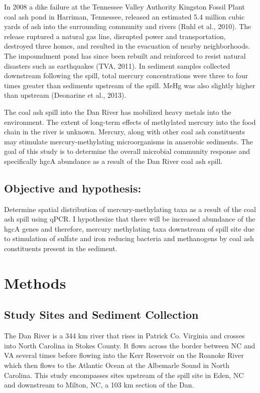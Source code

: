 \documentclass[ms]{uncgdissertationexp}
\theoremstyle{plain}
\theoremstyle{definition}
\theoremstyle{remark}
\begin{document}
  In 2008 a dike failure at the Tennessee Valley Authority Kingston Fossil
  Plant coal ash pond in Harriman, Tennessee, released an estimated 5.4
  million cubic yards of ash into the surrounding community and rivers
  (Ruhl et al., 2010). The release ruptured a natural gas line, disrupted
  power and transportation, destroyed three homes, and resulted in the
  evacuation of nearby neighborhoods. The impoundment pond has since been
  rebuilt and reinforced to resist natural disasters such as earthquakes
  (TVA, 2011). In sediment samples collected downstream following the
  spill, total mercury concentrations were three to four times greater
  than sediments upstream of the spill. MeHg was also slightly higher than
  upstream (Deonarine et al., 2013).
  
  The coal ash spill into the Dan River has mobilized heavy metals into
  the environment. The extent of long-term effects of methylated mercury
  into the food chain in the river is unknown. Mercury, along with other
  coal ash constituents may stimulate mercury-methylating microorganisms
  in anaerobic sediments. The goal of this study is to determine the
  overall microbial community response and specifically hgcA abundance as
  a result of the Dan River coal ash spill.
  
  \subsection{Objective and hypothesis:}\label{objective-and-hypothesis}
  
  Determine spatial distribution of mercury-methylating taxa as a result
  of the coal ash spill using qPCR. I hypothesize that there will be
  increased abundance of the hgcA genes and therefore, mercury methylating
  taxa downstream of spill site due to stimulation of sulfate and iron
  reducing bacteria and methanogens by coal ash constituents present in
  the sediment.
  
  \section{Methods}\label{methods}
  
  \subsection{Study Sites and Sediment
  Collection}\label{study-sites-and-sediment-collection}
  
  The Dan River is a 344 km river that rises in Patrick Co. Virginia and
  crosses into North Carolina in Stokes County. It flows across the border
  between NC and VA several times before flowing into the Kerr Reservoir
  on the Roanoke River which then flows to the Atlantic Ocean at the
  Albemarle Sound in North Carolina. This study encompasses sites upstream
  of the spill site in Eden, NC and downstream to Milton, NC, a 103 km
  section of the Dan.
  
\end{document}
